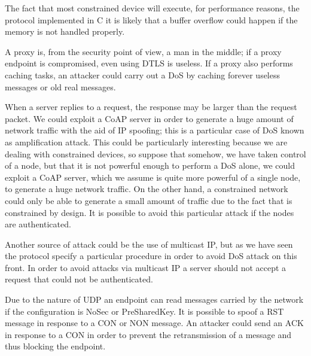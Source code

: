 	The fact that most constrained device will execute, for performance reasons, the protocol implemented in C it is likely that a buffer overflow could happen if the memory is not handled properly. \newline
	
	A proxy is, from the security point of view, a man in the middle; if a proxy endpoint is compromised, even using DTLS is useless.\newline
	If a proxy also performs caching tasks, an attacker could carry out a DoS by caching forever useless messages or old real messages.\newline
	
	When a server replies to a request, the response may be larger than the request packet.\newline
	We could exploit a CoAP server in order to generate a huge amount of network traffic with the aid of IP spoofing; this is a particular case of DoS known as amplification attack.\newline
	This could be particularly interesting because we are dealing with constrained devices, so suppose that somehow, we have taken control of a node, but that it is not powerful enough to perform a DoS alone, we could exploit a CoAP server, which we assume is quite more powerful of a single node, to generate a huge network traffic.\newline
	On the other hand, a constrained network could only be able to generate a small amount of traffic due to the fact that is constrained by design.\newline
	It is possible to avoid this particular attack if the nodes are authenticated.\newline
	
	Another source of attack could be the use of multicast IP, but as we have seen the protocol specify a particular procedure in order to avoid DoS attack on this front.\newline
	In order to avoid attacks via multicast IP a server should not accept a request that could not be authenticated.
	
	Due to the nature of UDP an endpoint can read messages carried by the network if the configuration is NoSec or PreSharedKey.\newline
	It is possible to spoof a RST message in response to a CON or NON message.
	An attacker could send an ACK in response to a CON in order to prevent the retransmission of a message and thus blocking the endpoint.\newline
	
